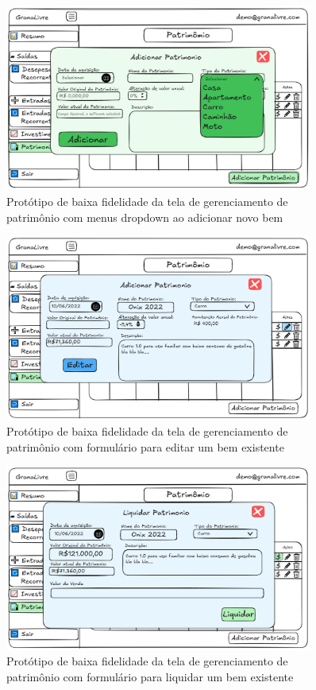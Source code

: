 \begin{figure}[H]
    \centering
    \includegraphics[width=0.9\textwidth]{imgs/09-patrimonio3.png}
    \caption{Protótipo de baixa fidelidade da tela de gerenciamento de patrimônio com menus dropdown ao adicionar novo bem}
    \label{fig:prot_patrimonio3}
\end{figure}

\begin{figure}[H]
    \centering
    \includegraphics[width=0.9\textwidth]{imgs/09-patrimonio4.png}
    \caption{Protótipo de baixa fidelidade da tela de gerenciamento de patrimônio com formulário para editar um bem existente}
    \label{fig:prot_patrimonio4}
\end{figure}

\begin{figure}[H]
    \centering
    \includegraphics[width=0.9\textwidth]{imgs/09-patrimonio5.png}
    \caption{Protótipo de baixa fidelidade da tela de gerenciamento de patrimônio com formulário para liquidar um bem existente}
    \label{fig:prot_patrimonio5}
\end{figure}

